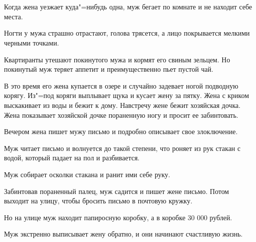 \\\

Когда жена уезжает куда"=нибудь  одна, муж бегает по комнате и не находит себе места.
  
Ногти у мужа страшно отрастают, голова трясется, а лицо покрывается мелкими черными точками.
    
Квартиранты  утешают покинутого мужа и кормят его свиным зельцем. Но покинутый муж теряет аппетит и преимущественно пьет пустой чай.
    
В это время его жена купается  в озере и случайно задевает ногой подводную корягу. Из"=под коряги выплывает  щука и кусает жену за пятку. Жена с криком выскакивает из воды  и бежит к дому. Навстречу жене бежит хозяйская дочка. Жена показывает хозяйской дочке пораненную ногу и просит ее забинтовать.
    
Вечером жена пишет мужу письмо и подробно описывает свое злоключение.
    
Муж читает письмо и волнуется  до  такой степени, что роняет из рук стакан с водой, который падает на пол и разбивается.
    
Муж собирает осколки стакана и ранит ими себе руку.

Забинтовав пораненный  палец, муж садится и пишет  жене  письмо.  Потом  выходит на улицу, чтобы бросить письмо в почтовую кружку.

Но  на улице муж находит папиросную  коробку, а в коробке 30 000 рублей.

Муж  экстренно  выписывает жену обратно, и они начинают счастливую жизнь.